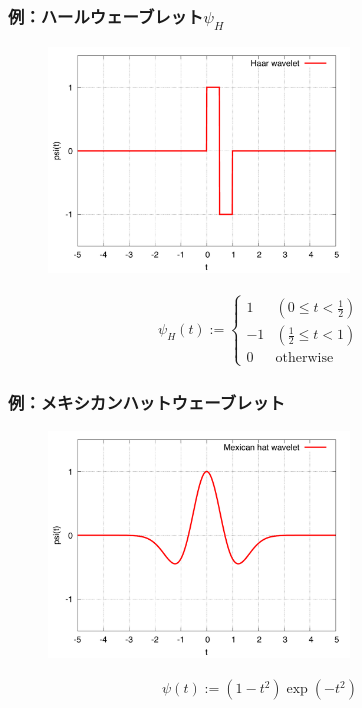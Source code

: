 \documentclass[dvipdfmx,graphicx,14pt]{beamer}
\begin{document}
\begin{frame}[c]
    \frametitle{例：ハールウェーブレット$\psi_{H}$}
    \vspace*{-10pt}
    \begin{figure}
        \includegraphics[width=80mm]{./figs/haar_wavelet.pdf}
    \end{figure}
    \vspace*{-5pt}
    \begin{align*}
        \psi_{H}(t) := 
        \left\{
           \begin{array}{cc}
               1  & (0 \leq t < \frac{1}{2}) \\
               -1 & (\frac{1}{2} \leq t < 1) \\
               0  & \text{otherwise}
           \end{array}
        \right. 
    \end{align*}
\end{frame}

\begin{frame}[c]
    \frametitle{例：メキシカンハットウェーブレット}
    \vspace*{-10pt}
    \begin{figure}
        \includegraphics[width=80mm]{./figs/mexicanhat_wavelet.pdf}
    \end{figure}
    \vspace*{-5pt}
    \begin{align*}
        \psi(t) := (1 - t^{2}) \exp(-t^{2})
    \end{align*}
\end{frame}
\end{document}
